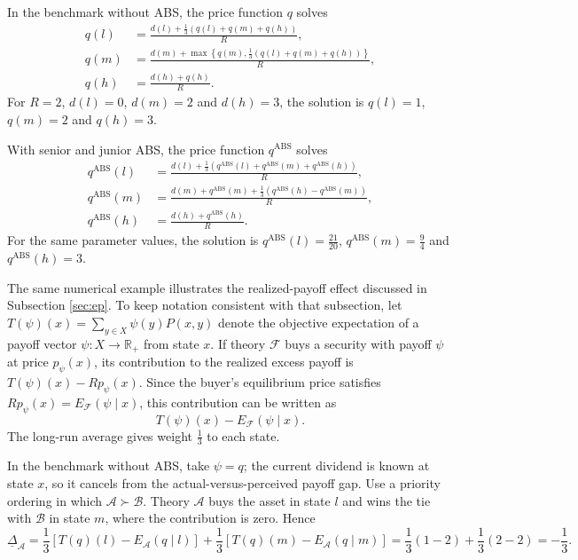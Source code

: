 \documentclass[11pt]{article}
\theoremstyle{plain}
\begin{document}
In the benchmark without ABS, the price function $q$ solves
\begin{align*}
q(l) & = \frac{d(l)+\frac{1}{3}\left(q(l)+q(m)+q(h)\right)}{R}, \\
q(m) & = \frac{ d(m) + \max \left\{ q(m), \frac{1}{3} \left( q(l)+q(m)+q(h)\right) \right\} } {R}, \\
q(h) & = \frac{d(h)+q(h)}{R}.
\end{align*}
For $R=2$, $d(l)=0$, $d(m)=2$ and $d(h)=3$, the solution is $q(l)=1$, $q(m)=2$ and $q(h)=3$.

With senior and junior ABS, the price function $q^{\mathrm{ABS}}$ solves
\begin{align*}
q^{\mathrm{ABS}}(l) & = \frac{d(l)+\frac{1}{3}\left(q^{\mathrm{ABS}}(l)+q^{\mathrm{ABS}}(m)+q^{\mathrm{ABS}}(h)\right)}{R}, \\
q^{\mathrm{ABS}}(m) & = \frac{ d(m) +  q^{\mathrm{ABS}}(m) + \frac{1}{3}(q^{\mathrm{ABS}}(h)-q^{\mathrm{ABS}}(m))} {R}, \\
q^{\mathrm{ABS}}(h) & = \frac{d(h)+q^{\mathrm{ABS}}(h)}{R}.
\end{align*}
For the same parameter values, the solution is $q^{\mathrm{ABS}}(l)=\frac{21}{20}$, $q^{\mathrm{ABS}}(m)=\frac{9}{4}$ and $q^{\mathrm{ABS}}(h)=3$.

The same numerical example illustrates the realized-payoff effect discussed in Subsection \ref{sec:ep}. To keep notation consistent with that subsection, let $T(\psi)(x)=\sum_{y\in X}\psi(y)P(x,y)$ denote the objective expectation of a payoff vector $\psi:X\to\mathbb{R}_{+}$ from state $x$. If theory $\mathcal{F}$ buys a security with payoff $\psi$ at price $p_\psi(x)$, its contribution to the realized excess payoff is $T(\psi)(x)-R p_\psi(x)$. Since the buyer's equilibrium price satisfies $R p_\psi(x)=E_{\mathcal{F}}(\psi\mid x)$, this contribution can be written as
\[
T(\psi)(x)-E_{\mathcal{F}}(\psi\mid x).
\]
The long-run average gives weight $\frac{1}{3}$ to each state.

In the benchmark without ABS, take $\psi=q$; the current dividend is known at state $x$, so it cancels from the actual-versus-perceived payoff gap. Use a priority ordering in which $\mathcal{A}\succ\mathcal{B}$. Theory $\mathcal{A}$ buys the asset in state $l$ and wins the tie with $\mathcal{B}$ in state $m$, where the contribution is zero. Hence
\[
\underline{\Delta}_{\mathcal{A}}
=\frac{1}{3}\left[T(q)(l)-E_{\mathcal{A}}(q\mid l)\right]
+\frac{1}{3}\left[T(q)(m)-E_{\mathcal{A}}(q\mid m)\right]
=\frac{1}{3}(1-2)+\frac{1}{3}(2-2)
=-\frac{1}{3}.
\]
\end{document}
